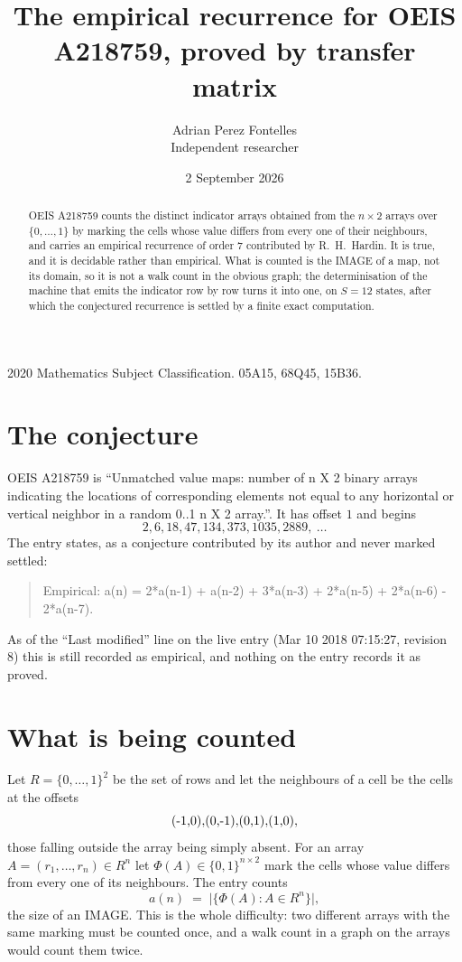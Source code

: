 \documentclass[11pt,a4paper]{article}
\title{The empirical recurrence for OEIS A218759, proved by transfer matrix}
\author{Adrian Perez Fontelles\\ \small Independent researcher}
\date{2 September 2026}
\theoremstyle{plain}
\theoremstyle{definition}
\begin{document}
\maketitle

\begin{abstract}
OEIS A218759 counts the distinct indicator arrays obtained from the $n\times2$ arrays over
$\{0,\dots,1\}$ by marking the cells whose value differs from every one of their neighbours, and carries an
empirical recurrence of order $7$ contributed by R.~H.~Hardin. It is true, and it is
decidable rather than empirical. What is counted is the IMAGE of a map, not its domain, so it
is not a walk count in the obvious graph; the determinisation of the machine that emits the
indicator row by row turns it into one, on $S=12$ states, after which the conjectured
recurrence is settled by a finite exact computation.
\end{abstract}

\noindent\small 2020 Mathematics Subject Classification. 05A15, 68Q45, 15B36.\normalsize

\section{The conjecture}

OEIS A218759 is ``Unmatched value maps: number of n X 2 binary arrays indicating the locations of corresponding elements not equal to any horizontal or vertical neighbor in a random 0..1 n X 2 array.''. It has offset $1$ and begins
\[
2, 6, 18, 47, 134, 373, 1035, 2889,\ \dots
\]
The entry states, as a conjecture contributed by its author and never marked settled:
\begin{quote}
Empirical: a(n) = 2*a(n-1) + a(n-2) + 3*a(n-3) + 2*a(n-5) + 2*a(n-6) - 2*a(n-7).
\end{quote}
As of the ``Last modified'' line on the live entry (Mar 10 2018 07:15:27, revision 8) this is still
recorded as empirical, and nothing on the entry records it as proved.

\section{What is being counted}

Let $R=\{0,\dots,1\}^{2}$ be the set of rows and let the neighbours of a cell be the
cells at the offsets
\[
$(-1,0)$, $(0,-1)$, $(0,1)$, $(1,0)$,
\]
those falling outside the array being simply absent. For an array
$A=(r_1,\dots,r_n)\in R^n$ let $\Phi(A)\in\{0,1\}^{n\times2}$ mark the cells whose value
differs from every one of its neighbours. The entry counts
\[
a(n)\;=\;\bigl|\{\Phi(A):A\in R^n\}\bigr| ,
\]
the size of an IMAGE. This is the whole difficulty: two different arrays with the same marking
must be counted once, and a walk count in a graph on the arrays would count them twice.
\end{document}
